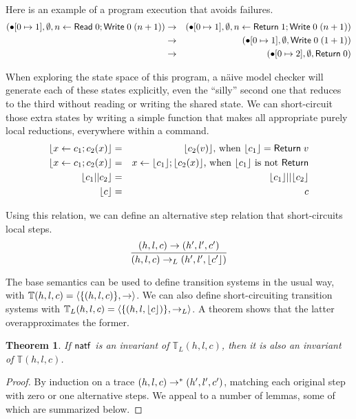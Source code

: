 \documentclass{amsbook}
\newtheorem{theorem}{Theorem}[chapter]
\theoremstyle{definition}
\theoremstyle{remark}
\numberwithin{section}{chapter}
\numberwithin{equation}{chapter}
\begin{document}
Here is an example of a program execution that avoids failures.
\begin{eqnarray*}
  (\bullet[0 \mapsto 1], \emptyset, n \leftarrow \mathsf{Read} \; 0; \mathsf{Write} \; 0 \; (n+1))
  &\rightarrow& (\bullet[0 \mapsto 1], \emptyset, n \leftarrow \mathsf{Return} \; 1; \mathsf{Write} \; 0 \; (n+1)) \\
  &\rightarrow& (\bullet[0 \mapsto 1], \emptyset, \mathsf{Write} \; 0 \; (1+1)) \\
  &\rightarrow& (\bullet[0 \mapsto 2], \emptyset, \mathsf{Return} \; 0)
\end{eqnarray*}

\newcommand{\rl}[1]{{\left \lfloor #1 \right \rfloor}}

When exploring the state space of this program, a n\"aive model checker will generate each of these states explicitly, even the ``silly'' second one that reduces to the third without reading or writing the shared state.
We can short-circuit those extra states by writing a simple function that makes all appropriate purely local reductions, everywhere within a command.
\begin{eqnarray*}
  \rl{x \leftarrow c_1; c_2(x)} &=& \rl{c_2(v)}\textrm{, when $\rl{c_1} = \mt{Return} \; v$} \\
  \rl{x \leftarrow c_1; c_2(x)} &=& x \leftarrow \rl{c_1}; \rl{c_2(x)}\textrm{, when $\rl{c_1}$ is not $\mt{Return}$} \\
  \rl{c_1 || c_2} &=& \rl{c_1} || \rl{c_2} \\
  \rl{c} &=& c
\end{eqnarray*}

\newcommand{\smallstepL}[2]{#1 \to_L #2}

Using this relation, we can define an alternative step relation that short-circuits local steps.
$$\infer{\smallstepL{(h, l, c)}{(h', l', \rl{c'})}}{
  \smallstep{(h, l, c)}{(h', l', c')}
}$$

The base semantics can be used to define transition systems in the usual way, with $\mathbb T(h, l, c) = {\left \langle \{(h, l, c)\}, \to \right \rangle}$.
We can also define short-circuiting transition systems with $\mathbb T_L(h, l, c) = \angled{\{(h, l, \rl{c})\}, \to_L}$.
A theorem shows that the latter overapproximates the former.

\abstraction
\begin{theorem}\label{local}
  If $\mathsf{natf}$ is an invariant of $\mathbb T_L(h, l, c)$, then it is also an invariant of $\mathbb T(h, l, c)$.
\end{theorem}
\begin{proof}
  By induction on a trace $(h, l, c) \to^* (h', l', c')$, matching each original step with zero or one alternative steps.
  We appeal to a number of lemmas, some of which are summarized below.
\end{proof}
\end{document}
